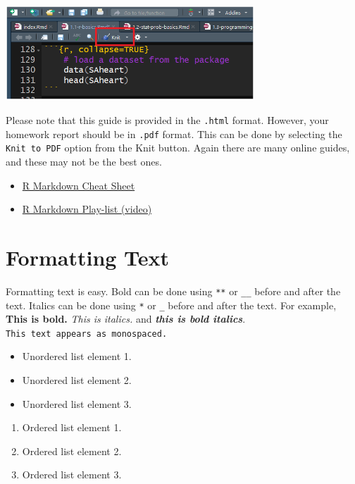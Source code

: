 \documentclass[
]{book}
\providecommand{\tightlist}{%
  \setlength{\itemsep}{0pt}\setlength{\parskip}{0pt}}
\begin{document}
\includegraphics[width=0.7\textwidth,height=\textheight]{images/Knit.png}

Please note that this guide is provided in the \texttt{.html} format. However, your homework report should be in \texttt{.pdf} format. This can be done by selecting the \texttt{Knit\ to\ PDF} option from the Knit button. Again there are many online guides, and these may not be the best ones.

\begin{itemize}
\tightlist
\item
  \href{https://www.rstudio.com/wp-content/uploads/2015/02/rmarkdown-cheatsheet.pdf}{R Markdown Cheat Sheet}
\item
  \href{https://www.youtube.com/playlist?list=PLBgxzZMu3GpNgd07DwmS-2odHtMO6MWGH}{R Markdown Play-list (video)}
\end{itemize}

\hypertarget{formatting-text}{%
\section{Formatting Text}\label{formatting-text}}

Formatting text is easy. Bold can be done using \texttt{**} or \texttt{\_\_} before and after the text. Italics can be done using \texttt{*} or \texttt{\_} before and after the text. For example, \textbf{This is bold.} \emph{This is italics.} and \textbf{\emph{this is bold italics}}. \texttt{This\ text\ appears\ as\ monospaced.}

\begin{itemize}
\tightlist
\item
  Unordered list element 1.
\item
  Unordered list element 2.
\item
  Unordered list element 3.
\end{itemize}

\begin{enumerate}
\def\labelenumi{\arabic{enumi}.}
\tightlist
\item
  Ordered list element 1.
\item
  Ordered list element 2.
\item
  Ordered list element 3.
\end{enumerate}
\end{document}
